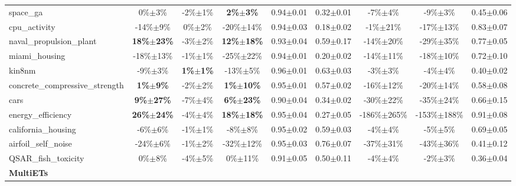 \begin{table}[t]
\begin{small}
\begin{sc}
{\begin{tabular}{lcccccccc}
space\_ga  &  0\%$\pm$3\%  &  -2\%$\pm$1\%  &  \textbf{2\%$\pm$3\%}  &  0.94$\pm$0.01  &  0.32$\pm$0.01  &  -7\%$\pm$4\%  &  -9\%$\pm$3\%  &  0.45$\pm$0.06 \\
cpu\_activity  &  -14\%$\pm$9\%  &  0\%$\pm$2\%  &  -20\%$\pm$14\%  &  0.94$\pm$0.03  &  0.18$\pm$0.02  &  -1\%$\pm$21\%  &  -17\%$\pm$13\%  &  0.83$\pm$0.07 \\
naval\_propulsion\_plant  &  \textbf{18\%$\pm$23\%}  &  -3\%$\pm$2\%  &  \textbf{12\%$\pm$18\%}  &  0.93$\pm$0.04  &  0.59$\pm$0.17  &  -14\%$\pm$20\%  &  -29\%$\pm$35\%  &  0.77$\pm$0.05 \\
miami\_housing  &  -18\%$\pm$13\%  &  -1\%$\pm$1\%  &  -25\%$\pm$22\%  &  0.94$\pm$0.01  &  0.20$\pm$0.02  &  -14\%$\pm$11\%  &  -18\%$\pm$10\%  &  0.72$\pm$0.10 \\
kin8nm  &  -9\%$\pm$3\%  &  \textbf{1\%$\pm$1\%}  &  -13\%$\pm$5\%  &  0.96$\pm$0.01  &  0.63$\pm$0.03  &  -3\%$\pm$3\%  &  -4\%$\pm$4\%  &  0.40$\pm$0.02 \\
concrete\_compressive\_strength  &  \textbf{1\%$\pm$9\%}  &  -2\%$\pm$2\%  &  \textbf{1\%$\pm$10\%}  &  0.95$\pm$0.01  &  0.57$\pm$0.02  &  -16\%$\pm$12\%  &  -20\%$\pm$14\%  &  0.58$\pm$0.08 \\
cars  &  \textbf{9\%$\pm$27\%}  &  -7\%$\pm$4\%  &  \textbf{6\%$\pm$23\%}  &  0.90$\pm$0.04  &  0.34$\pm$0.02  &  -30\%$\pm$22\%  &  -35\%$\pm$24\%  &  0.66$\pm$0.15 \\
energy\_efficiency  &  \textbf{26\%$\pm$24\%}  &  -4\%$\pm$4\%  &  \textbf{18\%$\pm$18\%}  &  0.95$\pm$0.04  &  0.27$\pm$0.05  &  -186\%$\pm$265\%  &  -153\%$\pm$188\%  &  0.91$\pm$0.08 \\
california\_housing  &  -6\%$\pm$6\%  &  -1\%$\pm$1\%  &  -8\%$\pm$8\%  &  0.95$\pm$0.02  &  0.59$\pm$0.03  &  -4\%$\pm$4\%  &  -5\%$\pm$5\%  &  0.69$\pm$0.05 \\
airfoil\_self\_noise  &  -24\%$\pm$6\%  &  -1\%$\pm$2\%  &  -32\%$\pm$12\%  &  0.95$\pm$0.03  &  0.76$\pm$0.07  &  -37\%$\pm$31\%  &  -43\%$\pm$36\%  &  0.41$\pm$0.12 \\
QSAR\_fish\_toxicity  &  0\%$\pm$8\%  &  -4\%$\pm$5\%  &  0\%$\pm$11\%  &  0.91$\pm$0.05  &  0.50$\pm$0.11  &  -4\%$\pm$4\%  &  -2\%$\pm$3\%  &  0.36$\pm$0.04 \\
\cmidrule(lr){1-9}
\textbf{MultiETs} & & & & & & & & \\ \cmidrule(lr){1-9}


\end{tabular}}
\end{sc}
\end{small}
\end{table}

